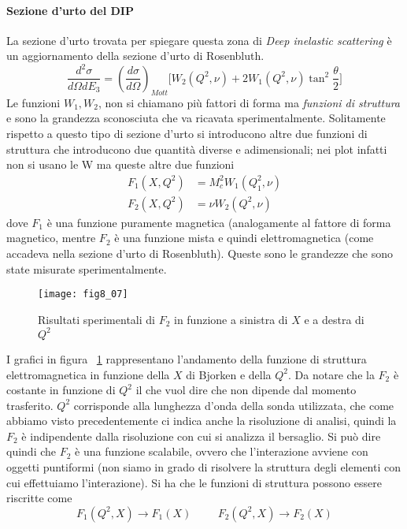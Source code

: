 \paragraph{Sezione d'urto del DIP}
La sezione d'urto trovata per spiegare questa zona di \emph{Deep inelastic scattering} è un aggiornamento della sezione d'urto di Rosenbluth.
\begin{equation}
\frac{d^2\sigma}{d\Omega dE_3}=\left(\frac{d\sigma}{d\Omega}\right)_{Mott}\biggl[W_2(Q^2,\nu)+2W_1(Q^2,\nu)\tan^2\frac{\theta}{2}\biggl]
\end{equation}
Le funzioni $W_1, W_2$, non si chiamano più fattori di forma ma \emph{funzioni di struttura} e sono la grandezza sconosciuta che va ricavata sperimentalmente.
Solitamente rispetto a questo tipo di sezione d'urto si introducono altre due funzioni di struttura che introducono due quantità diverse e adimensionali; nei plot infatti non si usano le W ma queste altre due funzioni
\begin{equation}
\begin{split}
F_1(X, Q^2) & =M_c^2W_1(Q_1^2,\nu)\\
F_2(X, Q^2) & =\nu W_2(Q^2,\nu)
\end{split}
\end{equation} 
dove $F_1$ è una funzione puramente magnetica (analogamente al fattore di forma magnetico, mentre $F_2$ è una funzione mista e quindi elettromagnetica (come accadeva nella sezione d'urto di Rosenbluth).
Queste sono le grandezze che sono state misurate sperimentalmente.
\begin{figure}[h]
\centering
\texttt{[image: fig8\_07]}
\caption{Risultati sperimentali di $F_2$ in funzione a sinistra di $X$ e a destra di $Q^2$}
\label{D:5}
\end{figure}

I grafici in figura ~\ref{D:5} rappresentano l'andamento della funzione di struttura elettromagnetica in funzione della $X$ di Bjorken e della $Q^2$.
Da notare che la $F_2$ è costante in funzione di $Q^2$ il che vuol dire che non dipende dal momento trasferito.
$Q^2$ corrisponde alla lunghezza d'onda della sonda utilizzata, che come abbiamo visto precedentemente ci indica anche la risoluzione di analisi, quindi la $F_2$ è indipendente dalla risoluzione con cui si analizza il bersaglio.
Si può dire quindi che $F_2$ è una funzione scalabile, ovvero che l'interazione avviene con oggetti puntiformi (non siamo in grado di risolvere la struttura degli elementi con cui effettuiamo l'interazione).
Si ha che le funzioni di struttura possono essere riscritte come
\begin{equation}
F_1(Q^2, X)\to F_1(X)\hspace{1cm} F_2(Q^2, X)\to F_2(X)
\end{equation} 

